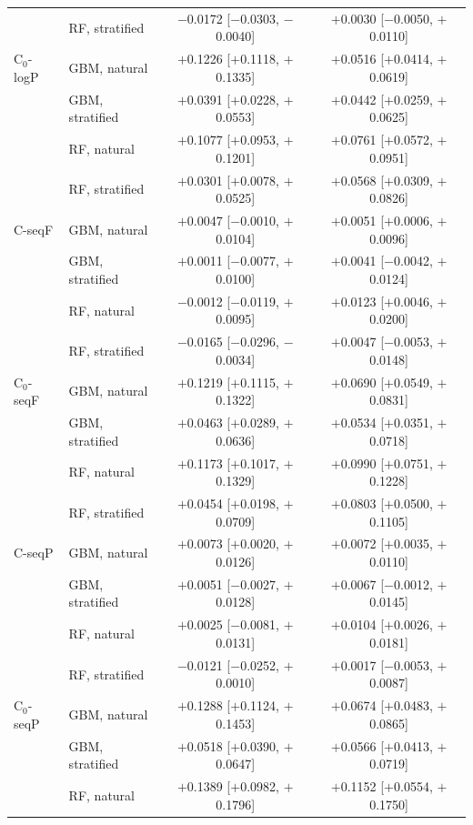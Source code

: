 \begin{longtable}{llcc}
 & RF, stratified & $-$0.0172 [$-$0.0303, $-$0.0040] & $+$0.0030 [$-$0.0050, $+$0.0110] \\
\addlinespace
C$_0$-logP & GBM, natural & $+$0.1226 [$+$0.1118, $+$0.1335] & $+$0.0516 [$+$0.0414, $+$0.0619] \\
 & GBM, stratified & $+$0.0391 [$+$0.0228, $+$0.0553] & $+$0.0442 [$+$0.0259, $+$0.0625] \\
 & RF, natural & $+$0.1077 [$+$0.0953, $+$0.1201] & $+$0.0761 [$+$0.0572, $+$0.0951] \\
 & RF, stratified & $+$0.0301 [$+$0.0078, $+$0.0525] & $+$0.0568 [$+$0.0309, $+$0.0826] \\
\addlinespace
C-seqF & GBM, natural & $+$0.0047 [$-$0.0010, $+$0.0104] & $+$0.0051 [$+$0.0006, $+$0.0096] \\
 & GBM, stratified & $+$0.0011 [$-$0.0077, $+$0.0100] & $+$0.0041 [$-$0.0042, $+$0.0124] \\
 & RF, natural & $-$0.0012 [$-$0.0119, $+$0.0095] & $+$0.0123 [$+$0.0046, $+$0.0200] \\
 & RF, stratified & $-$0.0165 [$-$0.0296, $-$0.0034] & $+$0.0047 [$-$0.0053, $+$0.0148] \\
\addlinespace
C$_0$-seqF & GBM, natural & $+$0.1219 [$+$0.1115, $+$0.1322] & $+$0.0690 [$+$0.0549, $+$0.0831] \\
 & GBM, stratified & $+$0.0463 [$+$0.0289, $+$0.0636] & $+$0.0534 [$+$0.0351, $+$0.0718] \\
 & RF, natural & $+$0.1173 [$+$0.1017, $+$0.1329] & $+$0.0990 [$+$0.0751, $+$0.1228] \\
 & RF, stratified & $+$0.0454 [$+$0.0198, $+$0.0709] & $+$0.0803 [$+$0.0500, $+$0.1105] \\
\addlinespace
C-seqP & GBM, natural & $+$0.0073 [$+$0.0020, $+$0.0126] & $+$0.0072 [$+$0.0035, $+$0.0110] \\
 & GBM, stratified & $+$0.0051 [$-$0.0027, $+$0.0128] & $+$0.0067 [$-$0.0012, $+$0.0145] \\
 & RF, natural & $+$0.0025 [$-$0.0081, $+$0.0131] & $+$0.0104 [$+$0.0026, $+$0.0181] \\
 & RF, stratified & $-$0.0121 [$-$0.0252, $+$0.0010] & $+$0.0017 [$-$0.0053, $+$0.0087] \\
\addlinespace
C$_0$-seqP & GBM, natural & $+$0.1288 [$+$0.1124, $+$0.1453] & $+$0.0674 [$+$0.0483, $+$0.0865] \\
 & GBM, stratified & $+$0.0518 [$+$0.0390, $+$0.0647] & $+$0.0566 [$+$0.0413, $+$0.0719] \\
 & RF, natural & $+$0.1389 [$+$0.0982, $+$0.1796] & $+$0.1152 [$+$0.0554, $+$0.1750] \\

\end{longtable}
